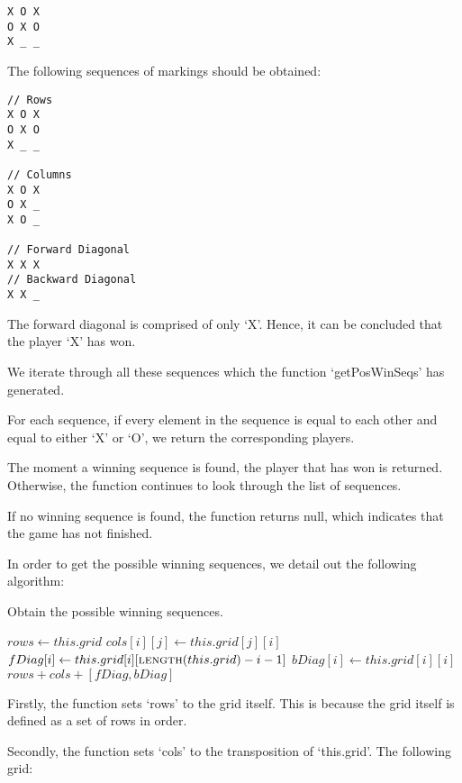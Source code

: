 \documentclass{article}
\begin{document}
\begin{verbatim}
X O X
O X O
X _ _
\end{verbatim}

The following sequences of markings should be obtained:

\begin{verbatim}
// Rows
X O X
O X O
X _ _

// Columns
X O X
O X _
X O _

// Forward Diagonal
X X X
// Backward Diagonal
X X _
\end{verbatim}

The forward diagonal is comprised of only `X'. Hence, it can be concluded that the player `X' has won.

We iterate through all these sequences which the function `getPosWinSeqs' has generated.

For each sequence, if every element in the sequence is equal to each other and equal to either `X' or `O', we return the corresponding players.

The moment a winning sequence is found, the player that has won is returned. Otherwise, the function continues to look through the list of sequences.

If no winning sequence is found, the function returns null, which indicates that the game has not finished.

In order to get the possible winning sequences, we detail out the following algorithm:

\begin{algorithm}
\caption{Obtain the possible winning sequences.}

\begin{algorithmic}[1]
  \State $rows \gets this.grid$
      \State $cols[i][j] \gets this.grid[j][i]$
    \EndFor
  \EndFor
    \State $fDiag[i] \gets this.grid[i][\Call{length}{this.grid} - i - 1]$
  \EndFor
    \State $bDiag[i] \gets this.grid[i][i]$
  \EndFor
  \Return $rows + cols + [fDiag, bDiag]$
\EndProcedure
\end{algorithmic}
\end{algorithm}

Firstly, the function sets `rows' to the grid itself. This is because the grid itself is defined as a set of rows in order.

Secondly, the function sets `cols' to the transposition of `this.grid'. The following grid:
\end{document}
